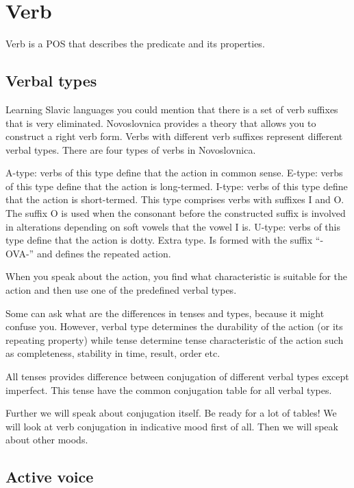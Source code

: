 \section{Verb}

Verb is a POS that describes the predicate and its properties. 


\subsection{Verbal types}

Learning Slavic languages you could mention that there is a set of verb suffixes that is very eliminated. Novoslovnica provides a theory that allows you to construct a right verb form.
Verbs with different verb suffixes represent different verbal types. There are four types of verbs in Novoslovnica.

A-type: verbs of this type define that the action in common sense.  
E-type: verbs of this type define that the action is long-termed.
I-type: verbs of this type define that the action is short-termed. This type comprises verbs with suffixes I and O. The suffix O is used when the consonant before the constructed suffix is involved in alterations depending on soft vowels that the vowel I is.
U-type: verbs of this type define that the action is dotty.
Extra type. Is formed with the suffix “-OVA-” and defines the repeated action.  

When you speak about the action, you find what characteristic is suitable for the action and then use one of the predefined verbal types.

Some can ask what are the differences in tenses and types, because it might confuse you. However, verbal type determines the durability of the action (or its repeating property) while tense determine tense characteristic of the action such as completeness, stability in time, result, order etc.

All tenses provides difference between conjugation of different verbal types except imperfect. This tense have the common conjugation table for all verbal types. 

Further we will speak about conjugation itself. Be ready for a lot of tables! We will look at verb conjugation in indicative mood first of all. Then we will speak about other moods.

\subsection{Active voice}

